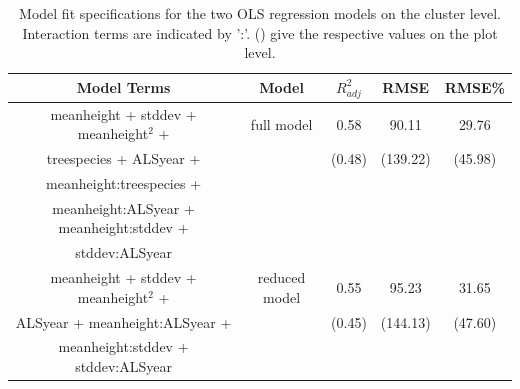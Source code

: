 \documentclass[remotesensing,article,accept,moreauthors,pdftex,10pt,a4paper]{Definitions/mdpi}
\begin{document}

\begin{table}[H]
	\begin{center}
	\caption{Model fit specifications for the two OLS regression models on the cluster level. Interaction terms are indicated by ':'. () give the respective values on the plot level.} 
	\label{tab:modacc_modterms}
    {\small %
	\begin{tabular}{ccccc}
\toprule
\textbf{Model Terms} & \textbf{Model} & \boldmath$R^2_{adj}$ & \textbf{RMSE} & \textbf{RMSE}\% \\ 
\midrule
meanheight + stddev + meanheight$^2$ +  & full model &  0.58 & 90.11  & 29.76 \\
treespecies + ALSyear + & & (0.48) &  (139.22) & (45.98) \\ 
meanheight:treespecies + \\ meanheight:ALSyear + meanheight:stddev + \\ stddev:ALSyear &&& \\ \midrule
meanheight + stddev + meanheight$^2$ + & reduced model  & 0.55  & 95.23 & 31.65 \\
ALSyear + meanheight:ALSyear + & & (0.45) & (144.13) & (47.60) \\
meanheight:stddev + stddev:ALSyear &&& \\  
\bottomrule
\end{tabular}
}%
\end{center}
\end{table}
\vspace{-12pt}
\end{document}
